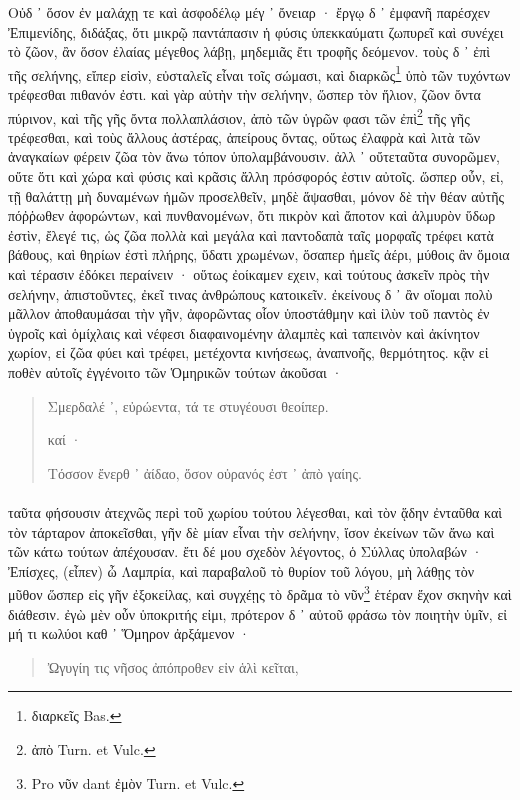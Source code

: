 \documentclass[a4paper, 11pt, oneside, polutonikogreek, german]{article}
\begin{document}
Οὐδ ᾽ ὅσον ἐν μαλάχῃ τε καὶ ἀσφοδέλῳ μέγ ᾽ ὄνειαρ · ἔργῳ δ ᾽ ἐμφανῆ παρέσχεν Ἐπιμενίδης, διδάξας, ὅτι μικρῷ παντάπασιν ἡ φύσις ὑπεκκαύματι ζωπυρεῖ καὶ συνέχει τὸ ζῶον, ἂν ὅσον ἐλαίας μέγεθος λάβῃ, μηδεμιᾶς ἔτι τροφῆς δεόμενον. τοὺς δ ᾽ ἐπὶ τῆς σελήνης, εἴπερ εἰσὶν, εὐσταλεῖς εἶναι τοῖς σώμασι, καὶ διαρκῶς\footnote{διαρκεῖς Bas.} ὑπὸ τῶν τυχόντων τρέφεσθαι πιθανόν ἐστι. καὶ γὰρ αὐτὴν τὴν σελήνην, ὥσπερ τὸν ἥλιον, ζῶον ὄντα πύρινον, καὶ τῆς γῆς ὄντα πολλαπλάσιον, ἀπὸ τῶν ὑγρῶν φασι τῶν ἐπὶ\footnote{ἀπὸ Turn. et Vulc.} τῆς γῆς τρέφεσθαι, καὶ τοὺς ἄλλους ἀστέρας, ἀπείρους ὄντας, οὕτως ἐλαφρὰ καὶ λιτὰ τῶν ἀναγκαίων φέρειν ζῶα τὸν ἄνω τόπον ὑπολαμβάνουσιν. ἀλλ ᾽ οὔτεταῦτα συνορῶμεν, οὔτε ὅτι καὶ χώρα καὶ φύσις καὶ κρᾶσις ἄλλη πρόσφορός ἐστιν αὐτοῖς. ὥσπερ οὖν, εἰ, τῇ θαλάττῃ μὴ δυναμένων ἡμῶν προσελθεῖν, μηδὲ ἅψασθαι, μόνον δὲ τὴν θέαν αὐτῆς πόῤῥωθεν ἀφορώντων, καὶ πυνθανομένων, ὅτι πικρὸν καὶ ἄποτον καὶ ἁλμυρὸν ὕδωρ ἐστὶν, ἔλεγέ τις, ὡς ζῶα πολλὰ καὶ μεγάλα καὶ παντοδαπὰ ταῖς μορφαῖς τρέφει κατὰ βάθους, καὶ θηρίων ἐστὶ πλήρης, ὕδατι χρωμένων, ὅσαπερ ἡμεῖς ἀέρι, μύθοις ἂν ὅμοια καὶ τέρασιν ἐδόκει περαίνειν · οὕτως ἐοίκαμεν εχειν, καὶ τούτους ἀσκεῖν πρὸς τὴν σελήνην, ἀπιστοῦντες, ἐκεῖ τινας ἀνθρώπους κατοικεῖν. ἐκείνους δ ᾽ ἂν οἴομαι πολὺ μᾶλλον ἀποθαυμάσαι τὴν γῆν, ἀφορῶντας οἷον ὑποστάθμην καὶ ἰλὺν τοῦ παντὸς ἐν ὑγροῖς καὶ ὁμίχλαις καὶ νέφεσι διαφαινομένην ἀλαμπὲς καὶ ταπεινὸν καὶ ἀκίνητον χωρίον, εἰ ζῶα φύει καὶ τρέφει, μετέχοντα κινήσεως, ἀναπνοῆς, θερμότητος. κᾂν εἰ ποθὲν αὐτοῖς ἐγγένοιτο τῶν Ὁμηρικῶν τούτων ἀκοῦσαι ·
\begin{quotation}
Σμερδαλέ ᾽, εὐρώεντα, τά τε στυγέουσι θεοίπερ.

καί ·

Τόσσον ἔνερθ ᾽ ἀίδαο, ὅσον οὐρανός ἐστ ᾽ ἀπὸ γαίης.
\end{quotation}
\paragraph{}
ταῦτα φήσουσιν ἀτεχνῶς περὶ τοῦ χωρίου τούτου λέγεσθαι, καὶ τὸν ᾅδην ἐνταῦθα καὶ τὸν τάρταρον ἀποκεῖσθαι, γῆν δὲ μίαν εἶναι τὴν σελήνην, ἴσον ἐκείνων τῶν ἄνω καὶ τῶν κάτω τούτων ἀπέχουσαν. ἔτι δέ μου σχεδὸν λέγοντος, ὁ Σύλλας ὑπολαβών · Ἐπίσχες, (εἶπεν) ὦ Λαμπρία, καὶ παραβαλοῦ τὸ θυρίον τοῦ λόγου, μὴ λάθῃς τὸν μῦθον ὥσπερ εἰς γῆν ἐξοκείλας, καὶ συγχέῃς τὸ δρᾶμα τὸ νῦν\footnote{Pro νῦν dant ἐμὸν Turn. et Vulc.} ἑτέραν ἔχον σκηνὴν καὶ διάθεσιν. ἐγὼ μὲν οὖν ὑποκριτής εἰμι, πρότερον δ ᾽ αὐτοῦ φράσω τὸν ποιητὴν ὑμῖν, εἰ μή τι κωλύοι καθ ᾽ Ὅμηρον ἀρξάμενον ·
\begin{quotation}
Ὠγυγίη τις νῆσος ἀπόπροθεν εἰν ἁλὶ κεῖται,
\end{quotation}
\end{document}
